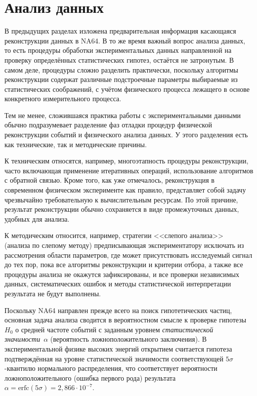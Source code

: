 \section{Анализ данных}

В предыдущих разделах изложена предварительная информация касающаяся
реконструкции данных в NA64. В то же время важный вопрос анализа
данных, то есть процедуры обработки экспериментальных данных
направленной на проверку определённых статистических гипотез,
остаётся не затронутым. В самом деле, процедуры сложно разделить
практически, поскольку алгоритмы реконструкции содержат
различные подстроечные параметры выбираемые из статистических
соображений, с учётом физического процесса лежащего в основе
конкретного измерительного процесса.

Тем не менее, сложившаяся практика работы с экспериментальными
данными обычно подразумевает разделение фаз отладки процедур
физической реконструкции событий и физического анализа данных.
У этого разделения есть как технические, так и методические причины.

К техническим относятся, например, многоэтапность процедуры
реконструкции, часто включающая применение итеративных операций,
использование алгоритмов с обратной связью. Кроме того, как уже
отмечалось, реконструкция в современном физическом эксперименте
как правило, представляет собой задачу чрезвычайно требовательную
к вычислительным ресурсам. По этой причине, результат
реконструкции обычно сохраняется в виде промежуточных данных,
удобных для анализа.

К методическим относится, например,
стратегии <<слепого анализа>>~\cite{blind-analysis} (анализа по слепому методу)
предписывающая экспериментатору исключать из рассмотрения
области параметров, где может присутствовать исследуемый
сигнал до тех пор, пока все алгоритмы реконструкции и критерии отбора,
а также все процедуры анализа не окажутся
зафиксированы, и все проверки независимых данных, систематических
ошибок и методы статистической интерпретации результата не будут
выполнены.

Поскольку NA64 направлен прежде всего на поиск гипотетических частиц,
основная задача анализа сводится в вероятностном
смысле к проверке гипотезы $H_0$ о средней частоте событий с
заданным уровнем \emph{статистической значимости}~$\alpha$
(вероятность ложноположительного заключения).
В экспериментальной физике высоких энергий открытием считается
гипотеза подтверждённая на уровне статистической значимости
соответствующей $5\sigma$-квантилю нормального распределения,
что соответствует вероятности ложноположительного (ошибка первого рода)
результата~$\alpha =\text{erfc}(5\sigma) =2{,}866\cdot10^{-7}$.

